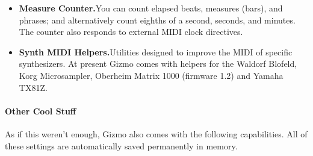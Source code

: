 \documentclass{article}
\begin{document}
\begin{itemize}
\item {\bf  Measure Counter.}\quad You can count elapsed beats, measures (bars), and phrases; and alternatively count eighths of a second, seconds, and minutes.  The counter also responds to external MIDI clock directives.

\item {\bf  Synth MIDI Helpers.}\quad Utilities designed to improve the MIDI of specific synthesizers.  At present Gizmo comes with helpers for the Waldorf Blofeld, Korg Microsampler, Oberheim Matrix 1000 (firmware 1.2) and Yamaha TX81Z.

\end{itemize}

\paragraph{Other Cool Stuff}

As if this weren't enough, Gizmo also comes with the following capabilities.  All of these settings are automatically saved permanently in memory.
\end{document}
